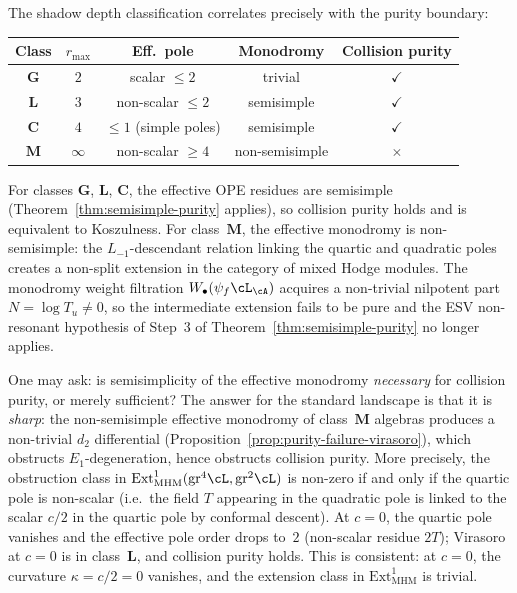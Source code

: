 \begin{remark}
\smallskip
The shadow depth classification correlates precisely with the purity
boundary:
\begin{center}
\renewcommand{\arraystretch}{1.25}
\begin{tabular}{@{}ccccc@{}}
\toprule
\textbf{Class} & $r_{\max}$ & \textbf{Eff.\ pole} &
 \textbf{Monodromy} & \textbf{Collision purity} \\
\midrule
$\mathbf{G}$ & $2$ & scalar $\leq 2$ & trivial &
 $\checkmark$ \\
$\mathbf{L}$ & $3$ & non-scalar $\leq 2$ & semisimple &
 $\checkmark$ \\
$\mathbf{C}$ & $4$ & $\leq 1$ (simple poles) & semisimple &
 $\checkmark$ \\
$\mathbf{M}$ & $\infty$ & non-scalar $\geq 4$ &
 non-semisimple & $\times$ \\
\bottomrule
\end{tabular}
\end{center}
For classes $\mathbf{G}$, $\mathbf{L}$, $\mathbf{C}$, the effective
OPE residues are semisimple (Theorem~\ref{thm:semisimple-purity}
applies), so collision purity holds and is equivalent to
Koszulness. For class~$\mathbf{M}$, the effective monodromy is
non-semisimple: the $L_{-1}$-descendant relation linking the
quartic and quadratic poles creates a non-split extension in the
category of mixed Hodge modules. The monodromy weight filtration
$W_\bullet(\psi_f \cL_\cA)$ acquires a non-trivial nilpotent part
$N = \log T_u \neq 0$, so the intermediate extension fails to be pure
and the ESV non-resonant hypothesis of Step~3 of
Theorem~\ref{thm:semisimple-purity} no longer applies.

\smallskip
One may ask: is semisimplicity of the effective monodromy
\emph{necessary} for collision purity, or merely sufficient? The
answer for the standard landscape is that it is \emph{sharp}: the
non-semisimple effective monodromy of class~$\mathbf{M}$ algebras
produces a non-trivial $d_2$ differential
(Proposition~\ref{prop:purity-failure-virasoro}), which obstructs
$E_1$-degeneration, hence obstructs collision purity. More
precisely, the obstruction class in
$\mathrm{Ext}^1_{\mathrm{MHM}}(\mathrm{gr}^4\cL, \mathrm{gr}^2\cL)$
is non-zero if and only if the quartic pole is non-scalar
(i.e.\ the field $T$ appearing in the quadratic pole is linked to
the scalar $c/2$ in the quartic pole by conformal descent). At
$c = 0$, the quartic pole vanishes and the effective pole order drops
to~$2$ (non-scalar residue $2T$); Virasoro at $c = 0$ is in
class~$\mathbf{L}$, and collision purity holds. This is consistent:
at $c = 0$, the curvature $\kappa = c/2 = 0$ vanishes, and the
extension class in $\mathrm{Ext}^1_{\mathrm{MHM}}$ is trivial.


\end{remark}
